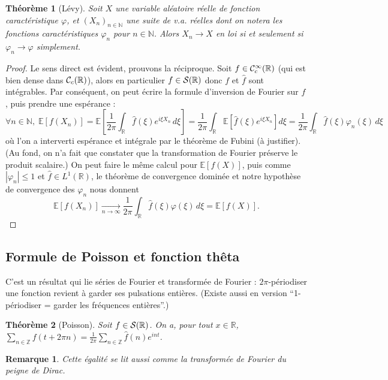 \documentclass[a4paper, 11pt]{article}
\def\Z{\mathbb{Z}}
\def\N{\mathbb{N}}
\def\R{\mathbb{R}}
\def\S{{\cal{S}}}
\def\Cf{{\cal{C}}}
\def\E{\mathbb{E}}
\newtheorem*{theorem}{Théorème}
\newtheorem*{remark}{Remarque}
\begin{document}
\begin{theorem}[Lévy]
  Soit $X$ une variable aléatoire réelle de fonction caractéristique $\varphi$, et
  $(X_n)_{n \in \N}$ une suite de v.a. réelles dont on notera les fonctions
  caractéristiques $\varphi_n$ pour $n \in \N$. Alors $X_n \rightarrow X$ en loi si
  et seulement si $\varphi_n \rightarrow \varphi$ simplement.
\end{theorem}
\begin{proof}
  Le sens direct est évident, prouvons la réciproque. Soit $f \in
  \Cf^\infty_c(\R)$ (qui est bien dense dans $\Cf_c(\R)$), alors en particulier
  $f \in \S(\R)$ donc $f$ et $\hat{f}$ sont intégrables. Par conséquent, on peut
  écrire la formule d'inversion de Fourier sur $f$, puis prendre une espérance :
  \[ \forall n \in \N,\; \E[ f(X_n) ] = 
    \E\left[ \frac{1}{2\pi} \int_\R \hat{f}(\xi) e^{i\xi X_n}\,d\xi \right] =
    \frac{1}{2\pi} \int_\R \E\left[ \hat{f}(\xi) e^{i\xi X_n} \right] d\xi =
    \frac{1}{2\pi} \int_\R \hat{f}(\xi) \varphi_n(\xi)\, d\xi
  \]
  où l'on a interverti espérance et intégrale par le théorème de Fubini (à
  justifier). (Au fond, on n'a fait que constater que la transformation de
  Fourier préserve le produit scalaire.) On peut faire le même calcul pour
  $\E[f(X)]$, puis comme $|\varphi_n| \leq 1$ et $\hat{f} \in L^1(\R)$, le théorème
  de convergence dominée et notre  hypothèse de convergence des $\varphi_n$ nous
  donnent
  \[ \E[ f(X_n) ] \xrightarrow[n \to \infty]{}
    \frac{1}{2\pi} \int_\R \hat{f}(\xi) \varphi(\xi)\, d\xi = \E[f(X)].  \]
\end{proof}

\newpage

\subsection{Formule de Poisson et fonction thêta}

C'est un résultat qui lie séries de Fourier et transformée de Fourier :
$2\pi$-périodiser une fonction revient à garder ses pulsations entières. (Existe
aussi en version \enquote{1-périodiser = garder les fréquences entières}.)

\begin{theorem}[Poisson]
  Soit $f \in \S(\R)$. On a, pour tout $x \in \R$,
  $\displaystyle \sum_{n \in \Z} f(t + 2\pi n) = \frac{1}{2\pi} \sum_{n \in \Z}
    \hat{f}(n)e^{int}$.
\end{theorem}

\begin{remark}
  Cette égalité se lit aussi comme la transformée de Fourier du peigne de Dirac.
\end{remark}
\end{document}
